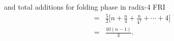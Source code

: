 \documentclass[11pt,runningheads]{llncs}
\begin{document}
and total additions for folding phase in radix-4 FRI
\begin{equation*}
    \begin{aligned}
        =& \frac{5}{2} \big[n + \frac{n}{4}+ \frac{n}{4^2}+ \cdots + 4 \big]\\
        =& \frac{10(n-1)}{3}.
    \end{aligned}
\end{equation*}








\end{document}
